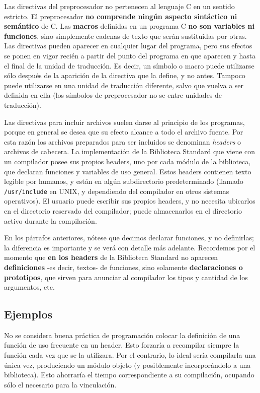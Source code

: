  
Las directivas del preprocesador no pertenecen al lenguaje C en un sentido estricto. El preprocesador
\textbf{no comprende ningún aspecto sintáctico ni semántico} de C. Las \textbf{macros} definidas en un programa C \textbf{no
son variables ni funciones}, sino simplemente cadenas de texto que serán sustituidas por otras. Las
directivas pueden aparecer en cualquier lugar del programa, pero sus efectos se ponen en vigor recién
a partir del punto del programa en que aparecen y hasta el final de la unidad de traducción. Es decir, un
símbolo o macro puede utilizarse sólo después de la aparición de la directiva que la define, y no antes.
Tampoco puede utilizarse en una unidad de traducción diferente, salvo que vuelva a ser definida en ella (los símbolos de preprocesador no se  entre unidades de traducción).

Las directivas para incluir archivos suelen darse al principio de los programas, porque en general se
desea que su efecto alcance a todo el archivo fuente. Por esta razón los archivos preparados para ser
incluidos se denominan \textit{headers} o archivos de cabecera. La implementación de la Biblioteca Standard
que viene con un compilador posee sus propios headers, uno por cada módulo de la biblioteca, que
declaran funciones y variables de uso general. Estos headers contienen texto legible por humanos, y
están en algún subdirectorio predeterminado (llamado \texttt{/usr/include} en UNIX, y dependiendo del
compilador en otros sistemas operativos). El usuario puede escribir sus propios headers, y no necesita
ubicarlos en el directorio reservado del compilador; puede almacenarlos en el directorio activo durante
la compilación. 

En los párrafos anteriores, nótese que decimos declarar funciones, y no definirlas; la diferencia es
importante y se verá con detalle más adelante. Recordemos por el momento que \textbf{en los headers} de la
Biblioteca Standard no aparecen \textbf{definiciones} -es decir, textos- de funciones, sino solamente
\textbf{declaraciones o prototipos}, que sirven para anunciar al compilador los tipos y cantidad de los
argumentos, etc.

\subsection{Ejemplos}
No se considera buena práctica de programación colocar la definición de una función de uso frecuente
en un header. Esto forzaría a recompilar siempre la función cada vez que se la utilizara. Por el
contrario, lo ideal sería compilarla una única vez, produciendo un módulo objeto (y posiblemente
incorporándolo a una biblioteca). Esto ahorraría el tiempo correspondiente a su compilación, ocupando
sólo el necesario para la vinculación.

